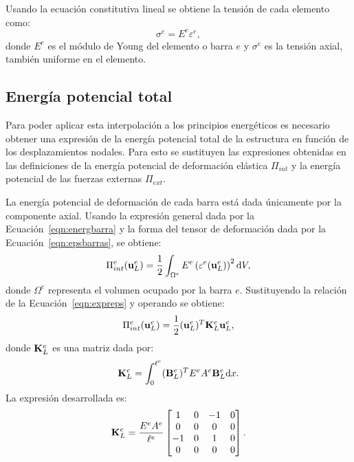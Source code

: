 Usando la ecuación constitutiva lineal se obtiene la tensión de cada elemento como:
%
\begin{equation}\label{eqn:barraeccons}
\sigma^e = E^e \varepsilon^e,
\end{equation}
donde $E^e$ es el módulo de Young del elemento o barra $e$ y $\sigma^e$ es la tensión axial, también uniforme en el elemento.


\subsection{Energía potencial total}

Para poder aplicar esta interpolación a los principios energéticos es necesario obtener una expresión de la energía potencial total de la estructura en función de los desplazamientos nodales. %
%
Para esto se sustituyen las expresiones obtenidas en las definiciones de la energía potencial de deformación elástica $\Pi_{int}$ y la energía potencial de las fuerzas externas $\Pi_{ext}$.

La energía potencial de deformación de cada barra está dada únicamente por la componente axial. Usando la expresión general dada por la Ecuación~\eqref{eqn:energbarra} y la forma del tensor de deformación dada por la Ecuación~\eqref{eqn:epsbarras}, se obtiene:
%
\begin{equation}
\Pi_{int}^e (\bfu_L^e) %
%
= \frac{1}{2} \int_{\Omega^e} E^e \left(\varepsilon^e (\bfu_L^e) \right)^2 \dif V ,
%
\end{equation}
%
donde $\Omega^e$ representa el volumen ocupado por la barra $e$. %
%
Sustituyendo la relación de la Ecuación~\eqref{eqn:expreps} y operando se obtiene:
%
\begin{equation}
\Pi_{int}^e({\bf u}_L^e) = \frac{1}{2} ({\bf u}_L^e)^T {\bf K}_L^e {\bf u}_L^e ,
\end{equation}
%
donde ${\bf K}_L^e$ es una matriz dada por:
%
\begin{equation}\label{eqn:defK}
 {\bf K}_L^e = \int_{0}^{\ell^e} ({\bf B}_L^e)^T E^e A^e {\bf B}_L^e {\text{d}} x.
\end{equation}
%
La expresión desarrollada es:
%
\begin{equation}
{\bf K}_L^e = \frac{E^e A^e}{\ell^e} 
\left[
\begin{matrix}
1 & 0 & -1 & 0 \\
0 & 0 & 0 & 0\\
-1 & 0 &  1 & 0\\
0 & 0 & 0 & 0
\end{matrix}
\right].
\end{equation}
%

